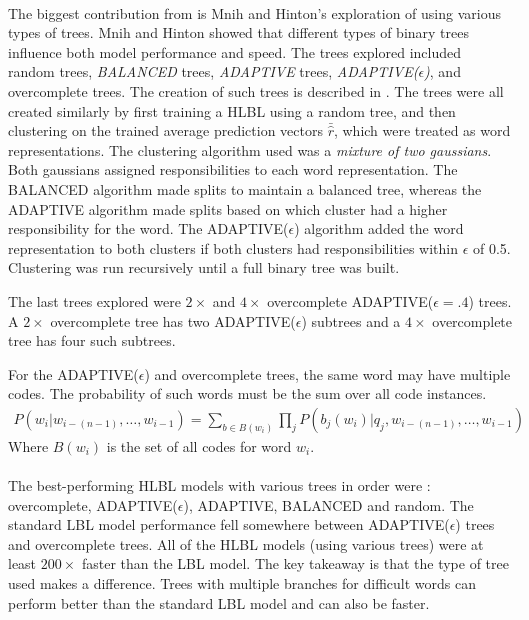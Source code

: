 \paragraph{}
The biggest contribution from \cite{MnihHinton2009} is  Mnih and Hinton's exploration of using various types of trees. Mnih and Hinton showed that different types of binary trees influence both model performance and speed. The trees explored included random trees, \emph{BALANCED} trees, \emph{ADAPTIVE} trees, \emph{ADAPTIVE($\epsilon$)}, and overcomplete trees. The creation of such trees is described in \cite{MnihHinton2009}.
The trees were all created similarly by first training a HLBL using a random tree, and then clustering on the trained average prediction vectors $\bar{\hat{r}}$, which were treated as word representations. The clustering algorithm used was a \emph{mixture of two gaussians}. Both gaussians assigned responsibilities to each word representation. The BALANCED algorithm made splits to maintain a balanced tree, whereas the ADAPTIVE algorithm made splits based on which cluster had a higher responsibility for the word. The ADAPTIVE($\epsilon$) algorithm added the word representation to both clusters if both clusters had responsibilities within $\epsilon$ of 0.5. Clustering was run recursively until a full binary tree was built. 

The last trees explored were $2\times$ and $4\times$ overcomplete ADAPTIVE($\epsilon=.4$) trees. A $2 \times$ overcomplete tree has two ADAPTIVE($\epsilon$) subtrees and a $4\times$ overcomplete tree has four such subtrees. 

For the ADAPTIVE($\epsilon$) and overcomplete trees, the same word may have multiple codes. The probability of such words must be the sum over all code instances.
\begin{align}
P(w_i | w_{i-(n-1)},\dots, w_{i-1}) = \sum_{b \in B(w_i)} \prod_j P(b_j(w_i) | q_j, w_{i-(n-1)},\dots, w_{i-1})
\end{align}
Where $B(w_i)$ is the set of all codes for word $w_i$.

\paragraph{}
The best-performing HLBL models with various trees in order were : overcomplete, ADAPTIVE($\epsilon$), ADAPTIVE, BALANCED and random. The standard LBL model performance fell somewhere between ADAPTIVE($\epsilon$) trees and overcomplete trees. All of the HLBL models (using various trees) were at least $200\times$ faster than the LBL model. 
The key takeaway is that the type of tree used makes a difference. Trees with multiple branches for difficult words can perform better than the standard LBL model and can also be faster.

